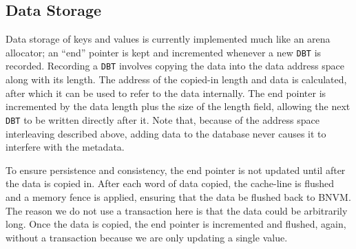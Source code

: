 \subsection{Data Storage}
\label{sec:ds}

Data storage of keys and values is currently implemented much like an arena
allocator; an ``end'' pointer is kept and incremented whenever a new \texttt{DBT} is
recorded. Recording a \texttt{DBT} involves copying the data into the data
address space along with its length. The address of the copied-in length and
data is calculated, after which it can be used to refer to the data internally.
The end pointer is incremented by the data length plus the size of the length
field, allowing the next \texttt{DBT} to be written directly after it. Note
that, because of the address space interleaving described above, adding data to
the database never causes it to interfere with the metadata.

To ensure persistence and consistency, the end pointer is not updated until
after the data is copied in. After each word of data copied, the cache-line
is flushed and a memory fence is applied, ensuring that the data be flushed back
to BNVM.
The reason we do not use a transaction here is that the
data could be arbitrarily long. Once the data is copied, the end pointer is
incremented and flushed, again, without a transaction because we are
only updating a single value.




